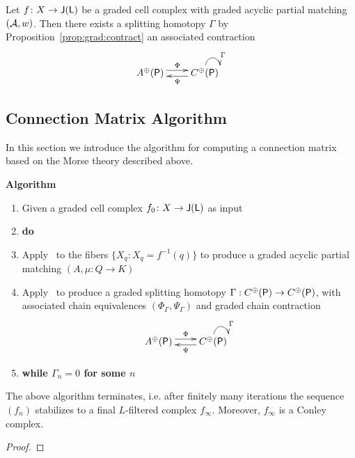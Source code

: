 Let $f\colon X\to {\mathsf J}({\mathsf L})$ be a  graded cell complex with graded acyclic partial matching $({\mathcal A},w)$.  Then there exists a splitting homotopy $\Gamma$ by Proposition~\ref{prop:grad:contract} an associated contraction
\[
\xymatrixrowsep{0.03in}
\xymatrixcolsep{0.3in}
\xymatrix{
A^\oplus(\sP)  \ar[r]<3pt>^{\Phi} & \ar[l]<3pt>^{\Psi} C^\oplus(\sP) \ar@(u,r)^{\Gamma}
}
\]



\subsection{Connection Matrix Algorithm}

In this section we introduce the algorithm for computing a connection matrix based on the Morse theory described above.

{\bf Algorithm}
\begin{enumerate}
\item Given a graded cell complex $f_0\colon X\to {\mathsf J}({\mathsf L})$ as input
\item {\bf do}
\item Apply~\cite[Algorithm 3.6]{focm} to the fibers $\{X_q\colon X_q = f^{-1}(q)\}$ to produce a graded acyclic partial matching $(A,\mu:Q\to K)$
\item Apply~\cite[Algorithm 3.12]{focm} to produce a graded splitting homotopy $\Gamma:C^\oplus({\mathsf P})\to C^\oplus({\mathsf P})$, with associated chain equivalences $(\Phi_\Gamma,\Psi_\Gamma)$ and graded chain contraction
\[
\xymatrixrowsep{0.03in}
\xymatrixcolsep{0.3in}
\xymatrix{
A^\oplus(\sP)  \ar[r]<3pt>^{\Phi} & \ar[l]<3pt>^{\Psi} C^\oplus(\sP) \ar@(u,r)^{\Gamma}
}
\]
\item {\bf while $\Gamma_n = 0$ for some $n$}
\end{enumerate}


\begin{thm}
The above algorithm terminates, i.e. after finitely many iterations the sequence $(f_n)$ stabilizes to a final $L$-filtered complex $f_\infty$.  Moreover, $f_\infty$ is a Conley complex.
\end{thm}
\begin{proof}

\end{proof}





